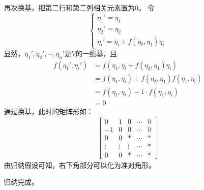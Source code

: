 \documentclass{article}
\begin{document}
再次换基，把第二行和第二列相关元素置为0。
令
\begin{equation*}
  \begin{cases*}
    \eta_1' = \eta_1 \\
    \eta_2' = \eta_2 \\
    \eta_i' = \eta_i + f(\eta_2, \eta_1) \eta_i
  \end{cases*}
\end{equation*}
显然，$\eta_1', \eta_2', \cdots, \eta_n'$是$V$的一组基，且
\begin{align*}
  f(\eta_1', \eta_i')
   & = f(\eta_1, \eta_i + f(\eta_2, \eta_1) \eta_i)            \\
   & = f(\eta_1, \eta_i) + f(\eta_2, \eta_1) f(\eta_1, \eta_i) \\
   & = f(\eta_1, \eta_i) - 1 \cdot f(\eta_1, \eta_i)           \\
   & = 0
\end{align*}
通过换基，此时的矩阵形如：
\begin{align*}
  \begin{bmatrix}
    0      & 1      & 0      & \cdots & 0 \\
    - 1    & 0      & 0      & \cdots & 0 \\
    0      & 0      & *      & \cdots & * \\
    \vdots & \vdots & \vdots & \cdots & * \\
    0      & 0      & *      & \cdots & *
  \end{bmatrix}
\end{align*}
由归纳假设可知，右下角部分可以化为准对角形。

归纳完成。
\end{document}
